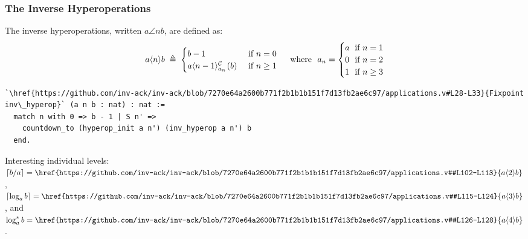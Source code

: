 \begin{frame}[fragile]
\frametitle{The Inverse Hyperoperations}
The inverse hyperoperations, written $a\angle{n}b$, are defined as:
\begin{equation*}
a\angle{n}b \; \triangleq \; \begin{cases}
b - 1 & \text{ if } n = 0 \\
\cdt{a\angle{n-1}}{a_n}(b) & \text{ if } n \ge 1
\end{cases}
\quad \text{ where } \ a_n = \begin{cases}
a & \hspace{-7pt}\text{ if } n = 1 \\
0 & \hspace{-7pt}\text{ if } n = 2 \\
1 & \hspace{-7pt}\text{ if } n \ge 3
\end{cases}
\end{equation*}
\begin{lstlisting}
`\href{https://github.com/inv-ack/inv-ack/blob/7270e64a2600b771f2b1b1b151f7d13fb2ae6c97/applications.v#L28-L33}{Fixpoint inv\_hyperop}` (a n b : nat) : nat :=
  match n with 0 => b - 1 | S n' =>
    countdown_to (hyperop_init a n') (inv_hyperop a n') b
  end.
\end{lstlisting}

\smallskip

Interesting individual levels:
$\left\lceil b/a \right\rceil = \href{https://github.com/inv-ack/inv-ack/blob/7270e64a2600b771f2b1b1b151f7d13fb2ae6c97/applications.v#L102-L113}{a\angle{2}b}$,
$\left\lceil \log_a b \right\rceil =
\href{https://github.com/inv-ack/inv-ack/blob/7270e64a2600b771f2b1b1b151f7d13fb2ae6c97/applications.v#L115-L124}{a\angle{3}b}$, and
$\log^*_a b =
\href{https://github.com/inv-ack/inv-ack/blob/7270e64a2600b771f2b1b1b151f7d13fb2ae6c97/applications.v#L126-L128}{a\angle{4}b}$.
\end{frame}


